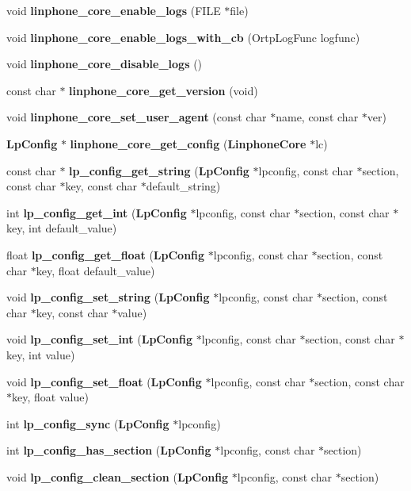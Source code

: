 \begin{DoxyCompactItemize}
\item 
void {\bf linphone\-\_\-core\-\_\-enable\-\_\-logs} (\-F\-I\-L\-E $\ast$file)
\item 
void {\bf linphone\-\_\-core\-\_\-enable\-\_\-logs\-\_\-with\-\_\-cb} (\-Ortp\-Log\-Func logfunc)
\item 
void {\bf linphone\-\_\-core\-\_\-disable\-\_\-logs} ()
\item 
const char $\ast$ {\bf linphone\-\_\-core\-\_\-get\-\_\-version} (void)
\item 
void {\bf linphone\-\_\-core\-\_\-set\-\_\-user\-\_\-agent} (const char $\ast$name, const char $\ast$ver)
\item 
{\bf \-Lp\-Config} $\ast$ {\bf linphone\-\_\-core\-\_\-get\-\_\-config} ({\bf \-Linphone\-Core} $\ast$lc)
\item 
const char $\ast$ {\bf lp\-\_\-config\-\_\-get\-\_\-string} ({\bf \-Lp\-Config} $\ast$lpconfig, const char $\ast$section, const char $\ast$key, const char $\ast$default\-\_\-string)
\item 
int {\bf lp\-\_\-config\-\_\-get\-\_\-int} ({\bf \-Lp\-Config} $\ast$lpconfig, const char $\ast$section, const char $\ast$key, int default\-\_\-value)
\item 
float {\bf lp\-\_\-config\-\_\-get\-\_\-float} ({\bf \-Lp\-Config} $\ast$lpconfig, const char $\ast$section, const char $\ast$key, float default\-\_\-value)
\item 
void {\bf lp\-\_\-config\-\_\-set\-\_\-string} ({\bf \-Lp\-Config} $\ast$lpconfig, const char $\ast$section, const char $\ast$key, const char $\ast$value)
\item 
void {\bf lp\-\_\-config\-\_\-set\-\_\-int} ({\bf \-Lp\-Config} $\ast$lpconfig, const char $\ast$section, const char $\ast$key, int value)
\item 
void {\bf lp\-\_\-config\-\_\-set\-\_\-float} ({\bf \-Lp\-Config} $\ast$lpconfig, const char $\ast$section, const char $\ast$key, float value)
\item 
int {\bf lp\-\_\-config\-\_\-sync} ({\bf \-Lp\-Config} $\ast$lpconfig)
\item 
int {\bf lp\-\_\-config\-\_\-has\-\_\-section} ({\bf \-Lp\-Config} $\ast$lpconfig, const char $\ast$section)
\item 
void {\bf lp\-\_\-config\-\_\-clean\-\_\-section} ({\bf \-Lp\-Config} $\ast$lpconfig, const char $\ast$section)
\end{DoxyCompactItemize}


